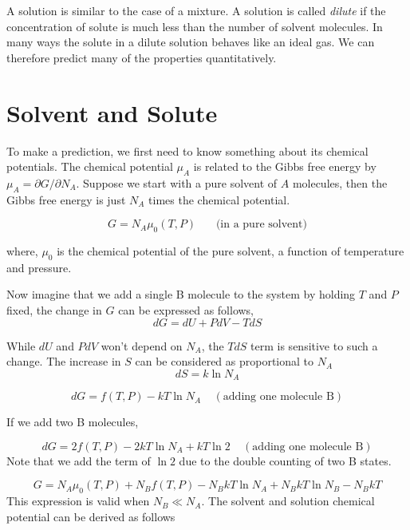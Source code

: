 
A solution is similar to the case of a mixture. A solution is called \textit{dilute} if the concentration of solute is much less than the number of solvent molecules. In many ways the solute in a dilute solution behaves like an ideal gas. We can therefore predict many of the properties quantitatively.

\section{Solvent and Solute}
To make a prediction, we first need to know something about its chemical potentials. The chemical potential $\mu_A$ is related to the Gibbs free energy by $\mu_A = \partial G/\partial N_A$. Suppose we start with a pure solvent of $A$ molecules, then the Gibbs free energy is just $N_A$ times the chemical potential.

\begin{equation}
G = N_A\mu_0(T, P)  ~~~~~~~~ \textrm{(in a pure solvent)}    
\end{equation}

where, $\mu_0$ is the chemical potential of the pure solvent, a function of temperature and pressure.

Now imagine that we add a single B molecule to the system by holding $T$ and $P$ fixed, the change in $G$ can be expressed as follows,
\begin{equation}
dG = dU + PdV - TdS    
\end{equation}

While $dU$ and $PdV$ won't depend on $N_A$, the $TdS$ term is sensitive to such a change. The increase in $S$ can be considered as proportional to $N_A$ 
\begin{equation}
dS = k\ln N_A     
\end{equation}

\begin{equation}
dG = f(T, P) - kT\ln N_A   ~~~~~(\textrm{adding one molecule B})  
\end{equation}

If we add two B molecules, 

\begin{equation}
dG = 2f(T, P) - 2kT\ln N_A + kT\ln2  ~~~~~(\textrm{adding one molecule B})  
\end{equation}
Note that we add the term of $\ln2$ due to the double counting of two B states.

\begin{equation}
G = N_A\mu_0(T, P) + N_Bf(T, P) - N_BkT\ln N_A  + N_BkT\ln N_B - N_BkT  
\end{equation}
This expression is valid when $N_B \ll N_A$. The solvent and solution chemical potential can be derived as follows

